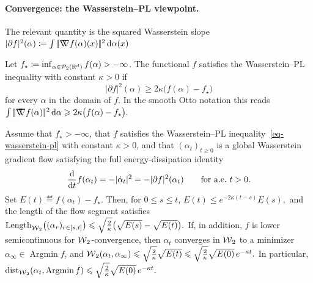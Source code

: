 \paragraph{Convergence: the Wasserstein--PL viewpoint.}
The relevant quantity is the squared Wasserstein slope
\(|\partial f|^2(\alpha) \coloneqq \int|\!| \mathord{\nabla\mkern-9.3mu\nabla} f(\alpha)(x) |\!|^2\,\mathrm{d}\alpha(x)\)
\begin{defn}\label{def-wasserstein-pl}
Let \(f_\star\coloneqq\inf_{\alpha\in\mathcal{P}_2(\mathbb{R}^d)} f(\alpha)>-\infty\). The functional \(f\) satisfies the Wasserstein--PL inequality with constant \(\kappa>0\) if
\begin{equation}\label{eq-wasserstein-pl}
|\partial f|^2(\alpha)
\geq
2\kappa\bigl(f(\alpha)-f_\star\bigr)
\end{equation}
for every \(\alpha\) in the domain of \(f\). In the smooth Otto notation this reads \(\int|\!| \mathord{\nabla\mkern-9.3mu\nabla} f(\alpha) |\!|^2\,\mathrm{d}\alpha \geqslant 2\kappa\bigl(f(\alpha)-f_\star\bigr).\)
\end{defn}
\begin{thm}\label{thm-wasserstein-pl-convergence}
Assume that \(f_\star>-\infty\), that \(f\) satisfies the Wasserstein--PL inequality~\eqref{eq-wasserstein-pl} with constant \(\kappa>0\), and that \((\alpha_t)_{t\geq0}\) is a global Wasserstein gradient flow satisfying the full energy-dissipation identity
\begin{equation}\label{eq-full-wasserstein-energy-dissipation}
\frac{\mathrm{d}}{\mathrm{d} t}f(\alpha_t)
=
-|\dot\alpha_t|^2
=
-|\partial f|^2(\alpha_t)
\qquad\text{for a.e.\ }t>0.
\end{equation}
Set \(E(t)\eqdef f(\alpha_t)-f_\star\). Then, for \(0\leq s\leq t\), \(E(t)\leq e^{-2\kappa(t-s)}E(s),\)
and the length of the flow segment satisfies \(\operatorname{Length}_{\operatorname{\mathcal{W}}_2}\bigl((\alpha_r)_{r\in[s,t]}\bigr) \leqslant \sqrt{\frac{2}{\kappa}}\bigl(\sqrt{E(s)}-\sqrt{E(t)}\bigr).\)
If, in addition, \(f\) is lower semicontinuous for \(\operatorname{\mathcal{W}}_2\)-convergence, then \(\alpha_t\) converges in \(\operatorname{\mathcal{W}}_2\) to a minimizer \(\alpha_\infty\in\operatorname{Argmin} f\), and
\(\operatorname{\mathcal{W}}_2(\alpha_t,\alpha_\infty) \leqslant \sqrt{\frac{2}{\kappa}}\sqrt{E(t)} \leqslant \sqrt{\frac{2}{\kappa}}\sqrt{E(0)}\,e^{-\kappa t}.\)
In particular, \(\operatorname{dist}_{\operatorname{\mathcal{W}}_2}(\alpha_t,\operatorname{Argmin}f) \leqslant \sqrt{\frac{2}{\kappa}}\sqrt{E(0)}\,e^{-\kappa t}.\)
\end{thm}
